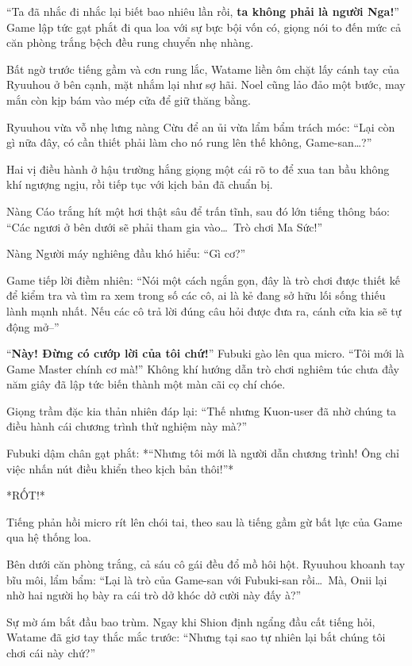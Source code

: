 \documentclass[../main.tex]{subfiles}
\begin{document}
``Ta đã nhắc đi nhắc lại biết bao nhiêu lần rồi, \textbf{ta không phải là người Nga!}'' Game lập tức gạt phắt đi qua loa với sự bực bội vốn có, giọng nói to đến mức cả căn phòng trắng bệch đều rung chuyển nhẹ nhàng.

Bất ngờ trước tiếng gầm và cơn rung lắc, Watame liền ôm chặt lấy cánh tay của Ryuuhou ở bên cạnh, mặt nhắm lại như sợ hãi. Noel cũng lảo đảo một bước, may mắn còn kịp bám vào mép cửa để giữ thăng bằng.

Ryuuhou vừa vỗ nhẹ lưng nàng Cừu để an ủi vừa lẩm bẩm trách móc: ``Lại còn gì nữa đây, có cần thiết phải làm cho nó rung lên thế không, Game-san\dots?''

Hai vị điều hành ở hậu trường hắng giọng một cái rõ to để xua tan bầu không khí ngượng ngịu, rồi tiếp tục với kịch bản đã chuẩn bị.

Nàng Cáo trắng hít một hơi thật sâu để trấn tĩnh, sau đó lớn tiếng thông báo: ``Các ngươi ở bên dưới sẽ phải tham gia vào\dots\ Trò chơi Ma Sức!''

Nàng Người máy nghiêng đầu khó hiểu: ``Gì cơ?''

Game tiếp lời điềm nhiên: ``Nói một cách ngắn gọn, đây là trò chơi được thiết kế để kiểm tra và tìm ra xem trong số các cô, ai là kẻ đang sở hữu lối sống thiếu lành mạnh nhất. Nếu các cô trả lời đúng câu hỏi được đưa ra, cánh cửa kia sẽ tự động mở--''

``\textbf{Này! Đừng có cướp lời của tôi chứ!}'' Fubuki gào lên qua micro. ``Tôi mới là Game Master chính cơ mà!'' Không khí hướng dẫn trò chơi nghiêm túc chưa đầy năm giây đã lập tức biến thành một màn cãi cọ chí chóe.

Giọng trầm đặc kia thản nhiên đáp lại: ``Thế nhưng Kuon-user đã nhờ chúng ta điều hành cái chương trình thử nghiệm này mà?''

Fubuki dậm chân gạt phắt: *``Nhưng tôi mới là người dẫn chương trình! Ông chỉ việc nhấn nút điều khiển theo kịch bản thôi!''*

*RỐT!*

Tiếng phản hồi micro rít lên chói tai, theo sau là tiếng gầm gừ bất lực của Game qua hệ thống loa.

Bên dưới căn phòng trắng, cả sáu cô gái đều đổ mồ hôi hột. Ryuuhou khoanh tay bĩu môi, lẩm bẩm: ``Lại là trò của Game-san với Fubuki-san rồi\dots\ Mà, Onii lại nhờ hai người họ bày ra cái trò dở khóc dở cười này đấy à?''

Sự mờ ám bắt đầu bao trùm. Ngay khi Shion định ngẩng đầu cất tiếng hỏi, Watame đã giơ tay thắc mắc trước: ``Nhưng tại sao tự nhiên lại bắt chúng tôi chơi cái này chứ?''
\end{document}
